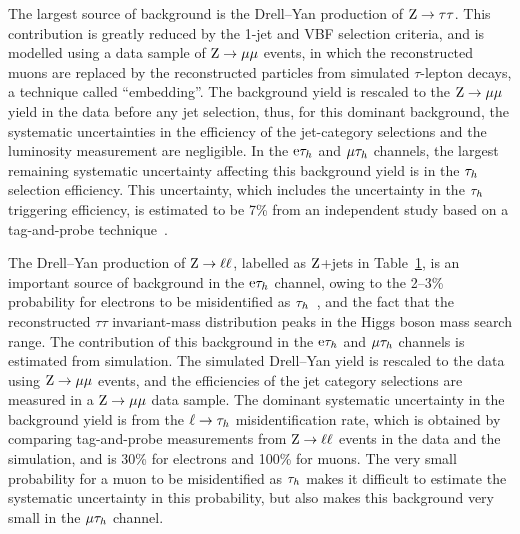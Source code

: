 \documentclass[11pt,twoside,a4paper,cmspaper,final,collab]{cms-tdr}
\begin{document}
\begin{table}[!hp]
\begin{center}
\begin{tabular}{c|c|c|c}
  \hline
\end{tabular}
\label{tab:htt_numevents}
\end{center}
\end{table}

The largest source of background is the Drell--Yan production of $\mathrm{Z}\to\tau\tau$.
This contribution is greatly reduced by the 1-jet and VBF selection criteria,
and is modelled using a data sample of $\mathrm{Z}\to{\mu}{\mu}$ events,
in which the reconstructed muons are replaced by the reconstructed particles from simulated $\tau$-lepton decays,
a technique called ``embedding''.
The background yield is rescaled to the $\mathrm{Z}\to{\mu}{\mu}$ yield in the data before any jet selection, thus,
for this dominant background, the systematic uncertainties in the efficiency of the jet-category selections and  the luminosity measurement are negligible.
In the $\mathrm{e}\tau_h$ and ${\mu}\tau_h$ channels, the largest remaining systematic uncertainty affecting this background yield is in the $\tau_h$ selection efficiency.
This uncertainty, which includes the uncertainty in the $\tau_h$ triggering efficiency, is estimated to be 7\% from an independent study based on a tag-and-probe technique~\cite{CMS:2011aa}.

The Drell--Yan production of $\mathrm{Z}\to \ell\ell$,
labelled as $\mathrm{Z}$+jets in Table~\ref{tab:htt_numevents},
is an important source of background in the $\mathrm{e}\tau_h$ channel,
owing to the 2--3\% probability for electrons to be misidentified as $\tau_h$~\cite{CMS-PAS-TAU-11-001},
and the fact that the reconstructed $\tau\tau$ invariant-mass distribution peaks in the Higgs boson mass search range.
The contribution of this background in the $\mathrm{e}\tau_h$ and $\mu\tau_h$ channels is estimated from simulation.
The simulated Drell--Yan yield is rescaled to the data using $\mathrm{Z}\to{\mu}{\mu}$ events,
and the efficiencies of the jet category selections are measured in a $\mathrm{Z}\to \mu\mu$ data sample.
The dominant systematic uncertainty in the background yield is from the $\ell \to \tau_h$ misidentification rate,
which is obtained by comparing tag-and-probe measurements from $\mathrm{Z}\to \ell\ell$ events in the data and the simulation,
and is 30\% for electrons and 100\% for muons.
The very small probability for a muon to be misidentified as $\tau_h$ makes
it difficult to estimate the systematic uncertainty in this probability, but also makes this background very small in the $\mu\tau_h$ channel.
\end{document}
